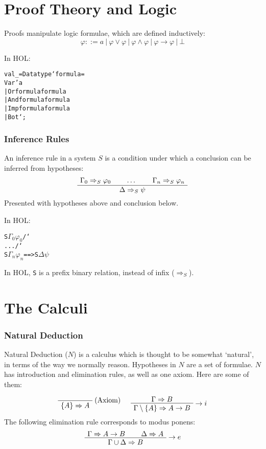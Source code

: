 \documentclass[english,svgnames,hide notes,12pt]{beamer}
\theoremstyle{definition}
\theoremstyle{remark}
\begin{document}
\section{Proof Theory and Logic}

\begin{frame}[fragile]
    Proofs manipulate logic formulae, which are defined inductively:
    \[ \varphi ::= a~|~\varphi \lor \varphi~|~\varphi \land \varphi~|~\varphi \to \varphi~|~\bot \]

    \bigskip
    In HOL:
    \small
    \begin{alltt}
        val _ = Datatype `formula =
            Var 'a
            | Or formula formula
            | And formula formula
            | Imp formula formula
            | Bot`;
    \end{alltt}
\end{frame}

\newcommand{\bs}{\char`\\}
\begin{frame}[fragile]
    \frametitle{Inference Rules}
    An inference rule in a system $S$ is a condition under which a conclusion can be inferred from hypotheses:
    \[
        \AxiomC{$\Gamma_0 \Rightarrow_S \varphi_0$}
        \AxiomC{$\dots$}
        \AxiomC{$\Gamma_n \Rightarrow_S \varphi_n$}  
        \TrinaryInfC{$\Delta \Rightarrow_S \psi$}
        \DisplayProof
    \]
    Presented with hypotheses above and conclusion below.

    \bigskip
    In HOL:
    \begin{alltt}
        S \(\Gamma_0\) \(\varphi_0\) /\bs{} ... /\bs{} S \(\Gamma_n\) \(\varphi_n\) ==> S \(\Delta\) \(\psi\)
    \end{alltt}

    In HOL, \texttt{S} is a prefix binary relation, instead of infix ($\Rightarrow_S$).
\end{frame}

\section{The Calculi}

\begin{frame}
    \frametitle{Natural Deduction}
    Natural Deduction ($N$) is a calculus which is thought to be somewhat `natural', in terms of the way we normally reason. Hypotheses in $N$ are a set of formulae. $N$ has introduction and elimination rules, as well as one axiom. Here are some of them:

    \[
        \AxiomC{}
        \RightLabel{(Axiom)}
        \UnaryInfC{$\{A\} \Rightarrow A$}
        \DisplayProof 
        \hspace{0.5cm}
        \AxiomC{$\Gamma \Rightarrow B$}
        \RightLabel{$\to i$}
        \UnaryInfC{$\Gamma\setminus\{A\}\Rightarrow A\to B$}
        \DisplayProof
    \]
    The following elimination rule corresponds to modus ponens:
    \[
        \AxiomC{$\Gamma\Rightarrow A\to B$}
        \AxiomC{$\Delta\Rightarrow A$}
        \RightLabel{$\to e$}
        \BinaryInfC{$\Gamma\cup\Delta\Rightarrow B$}
        \DisplayProof
    \]
\end{frame}
\end{document}
